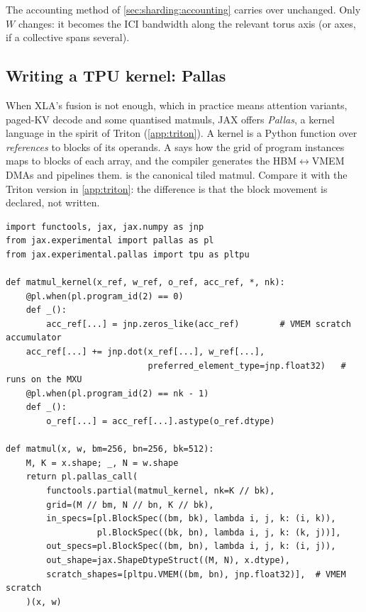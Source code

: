 The accounting method of \cref{sec:sharding:accounting} carries over unchanged. Only $W$ changes:
it becomes the ICI bandwidth along the relevant torus axis (or axes, if a collective spans
several).

\subsection{Writing a TPU kernel: Pallas}

When XLA's fusion is not enough, which in practice means attention variants, paged-KV decode and some
quantised matmuls, JAX offers \emph{Pallas}, a kernel language in the spirit of Triton
(\cref{app:triton}). A kernel is a Python function over \emph{references} to blocks of its operands. A
 says how the grid of program instances maps to blocks of each array, and the
compiler generates the HBM$\leftrightarrow$VMEM DMAs and pipelines them. 
is the canonical tiled matmul. Compare it with the Triton version in \cref{app:triton}: the
difference is that the block movement is declared, not written.

\begin{lstlisting}[caption={A tiled matmul in Pallas (illustrative; follows the public JAX documentation, not run here).},label={lst:accel:pallas}]
import functools, jax, jax.numpy as jnp
from jax.experimental import pallas as pl
from jax.experimental.pallas import tpu as pltpu

def matmul_kernel(x_ref, w_ref, o_ref, acc_ref, *, nk):
    @pl.when(pl.program_id(2) == 0)
    def _():
        acc_ref[...] = jnp.zeros_like(acc_ref)        # VMEM scratch accumulator
    acc_ref[...] += jnp.dot(x_ref[...], w_ref[...],
                            preferred_element_type=jnp.float32)   # runs on the MXU
    @pl.when(pl.program_id(2) == nk - 1)
    def _():
        o_ref[...] = acc_ref[...].astype(o_ref.dtype)

def matmul(x, w, bm=256, bn=256, bk=512):
    M, K = x.shape; _, N = w.shape
    return pl.pallas_call(
        functools.partial(matmul_kernel, nk=K // bk),
        grid=(M // bm, N // bn, K // bk),
        in_specs=[pl.BlockSpec((bm, bk), lambda i, j, k: (i, k)),
                  pl.BlockSpec((bk, bn), lambda i, j, k: (k, j))],
        out_specs=pl.BlockSpec((bm, bn), lambda i, j, k: (i, j)),
        out_shape=jax.ShapeDtypeStruct((M, N), x.dtype),
        scratch_shapes=[pltpu.VMEM((bm, bn), jnp.float32)],  # VMEM scratch
    )(x, w)
\end{lstlisting}

